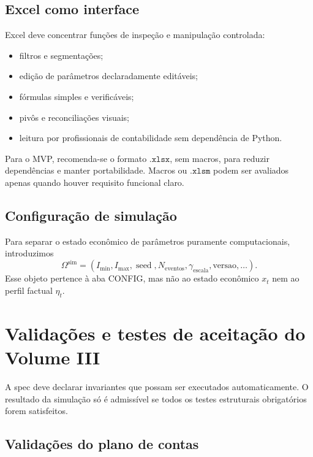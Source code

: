 \documentclass[11pt,a4paper]{article}
\newcommand{\seed}{\operatorname{seed}}
\begin{document}
\subsection{Excel como interface}

Excel deve concentrar funções de inspeção e manipulação controlada:
\begin{itemize}
    \item filtros e segmentações;
    \item edição de parâmetros declaradamente editáveis;
    \item fórmulas simples e verificáveis;
    \item pivôs e reconciliações visuais;
    \item leitura por profissionais de contabilidade sem dependência de Python.
\end{itemize}

Para o MVP, recomenda-se o formato $\texttt{.xlsx}$, sem macros, para reduzir dependências e manter portabilidade. Macros ou $\texttt{.xlsm}$ podem ser avaliados apenas quando houver requisito funcional claro.

\subsection{Configuração de simulação}

Para separar o estado econômico de parâmetros puramente computacionais, introduzimos
\begin{equation}
\boxed{
\Omega^{\mathrm{sim}}
=
(I_{\min},I_{\max},\seed,N_{\mathrm{eventos}},\gamma_{\mathrm{escala}},\mathrm{versao},\ldots).
}
\end{equation}
Esse objeto pertence à aba CONFIG, mas não ao estado econômico $x_t$ nem ao perfil factual $\eta_t$.

\section{Validações e testes de aceitação do Volume III}

A spec deve declarar invariantes que possam ser executados automaticamente. O resultado da simulação só é admissível se todos os testes estruturais obrigatórios forem satisfeitos.

\subsection{Validações do plano de contas}
\end{document}
